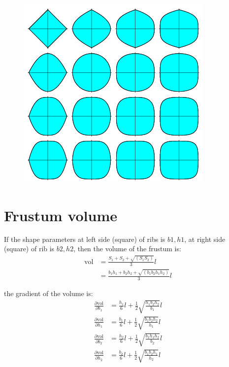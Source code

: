 \begin{figure}[h!]
	\centering
	\includegraphics[width=0.7\linewidth]{Figures/SuperellipseRegions_1000}
	\caption{}
	\label{fig:superellipseregions1000}
\end{figure}


\section{Frustum volume}
If the shape parameters at left side (square) of ribs is $ b1, h1 $, at right side (square) of rib is $ b2, h2 $, then the volume of the frustum is:
\begin{equation}\label{eq: frustum volume}
\begin{split}
\mathrm{vol} &= \frac{S_1 + S_2 + \sqrt{(S_1 S_2)}}{3} l \\
&= \frac{b_1 h_1 + b_2 h_2 + \sqrt{(b_1 b_2 h_1 h_2 )}}{3} l
\end{split}
\end{equation}

the gradient of the volume is:
\begin{equation}\label{key}
\begin{split}
\frac{\partial \mathrm{vol}}{\partial b_1} & = \frac{h_1}{6} l + \frac{1}{2} \sqrt{ \frac{h_1 b_2 h_2}{b_1}} l \\
\frac{\partial \mathrm{vol}}{\partial h_1} & = \frac{b_1}{6} l + \frac{1}{2} \sqrt{ \frac{b_1 b_2 h_2}{h_1}} l \\
\frac{\partial \mathrm{vol}}{\partial b_2} & = \frac{h_2}{6} l + \frac{1}{2} \sqrt{ \frac{b_1 h_1 h_2}{b_2}} l \\
\frac{\partial \mathrm{vol}}{\partial h_2} & = \frac{b_2}{6} l + \frac{1}{2} \sqrt{ \frac{b_1 b_2 h_1}{h_2}}  l
\end{split}
\end{equation}

